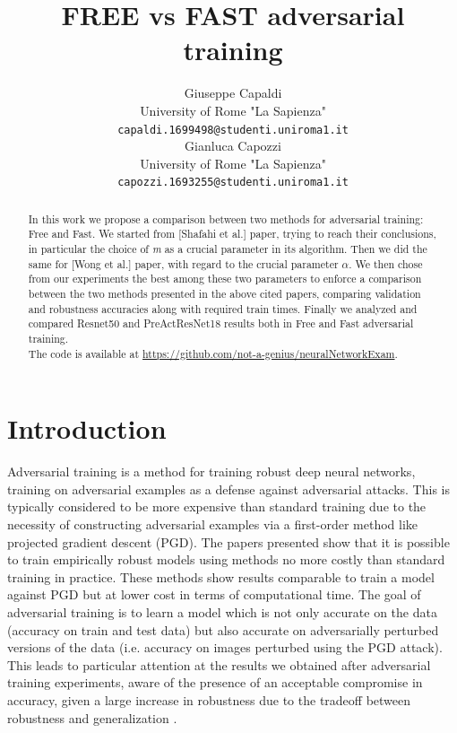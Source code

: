 \documentclass{article}
\title{FREE vs FAST adversarial training}
\author{Giuseppe Capaldi\\
	University of Rome "La Sapienza"\\
	\texttt{capaldi.1699498@studenti.uniroma1.it}\\
	\And Gianluca Capozzi\\
	University of Rome "La Sapienza"\\
	\texttt{capozzi.1693255@studenti.uniroma1.it}\\
}
\begin{document}
\maketitle

\begin{abstract}
In this work we propose a comparison between two methods for adversarial
training: Free and Fast. We started from [Shafahi et al.] \cite{ShafahiEtAl2019b} paper, trying to reach their conclusions, in particular the choice of \textit{m} as a crucial parameter in its algorithm. Then we did the same 
for [Wong et al.] \cite{WongEtAl2020} paper, with regard to the crucial parameter $\alpha$.
We then chose from our experiments  the best among these two parameters to enforce a comparison between the two methods presented in the above cited papers, comparing validation and robustness accuracies along with required train times. Finally we analyzed and compared Resnet50 and PreActResNet18 results both in Free and Fast adversarial training.\\
 The code is available at
\url{https://github.com/not-a-genius/neuralNetworkExam}.
\end{abstract}

\section{Introduction}
Adversarial training is a method for training robust deep neural networks,
training on adversarial examples as a defense against adversarial attacks. This
is typically considered to be more expensive than standard training due to the
necessity of constructing adversarial examples via a first-order method like
projected gradient descent (PGD). The papers presented show that it is possible
to train empirically robust models using methods no more costly than standard
training in practice. These methods show results comparable to train a model
against PGD but at lower cost in terms of computational time. The goal of
adversarial training is to learn a model which is not only accurate on the data
(accuracy on train and test data) but also accurate on adversarially perturbed
versions of the data (i.e. accuracy on images perturbed using the PGD attack).  
This leads to particular attention at the results we obtained after adversarial
training experiments, aware of the presence of an acceptable compromise in
accuracy, given a large increase in robustness due to the tradeoff between
robustness and generalization \cite{TsiprasEtAl, ZhangEtAl2019a,
ShafahiEtAl2019a}.
\end{document}
